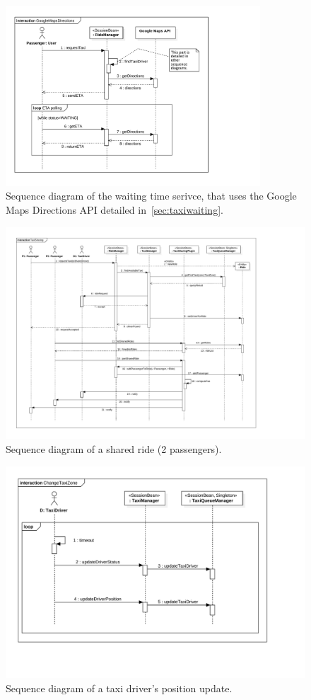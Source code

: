 \begin{figure}[h]
    \centering
    \includegraphics[width=0.85\textwidth]{diagrams/sequence_gmaps}
    \caption{Sequence diagram of the waiting time serivce, that uses the Google Maps Directions API detailed in~\autoref{sec:taxiwaiting}.}
    \label{fig:sequence-gmaps}
\end{figure}

\begin{figure}[h]
    \centering
    \includegraphics[width=\textwidth]{diagrams/sequence_taxisharing}
    \caption{Sequence diagram of a shared ride (2 passengers).}
    \label{fig:sequence-sharing}
\end{figure}

\begin{figure}[h]
    \centering
    \includegraphics[width=\textwidth]{diagrams/sequence_taxi_change_zone}
    \caption{Sequence diagram of a taxi driver's position update.}
    \label{fig:sequence-changezone}
\end{figure}

\FloatBarrier
